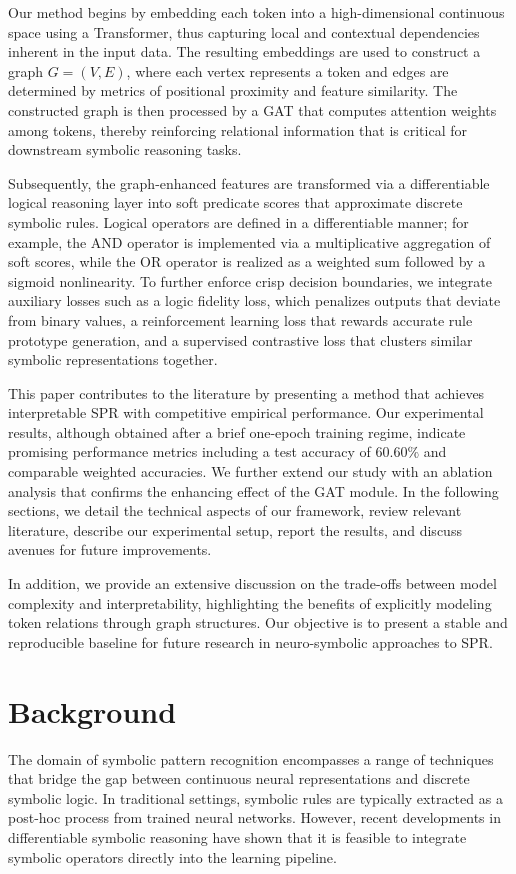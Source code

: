 \documentclass{article}
\begin{document}
Our method begins by embedding each token into a high-dimensional continuous space using a Transformer, thus capturing local and contextual dependencies inherent in the input data. The resulting embeddings are used to construct a graph \(G=(V,E)\), where each vertex represents a token and edges are determined by metrics of positional proximity and feature similarity. The constructed graph is then processed by a GAT that computes attention weights among tokens, thereby reinforcing relational information that is critical for downstream symbolic reasoning tasks.

Subsequently, the graph-enhanced features are transformed via a differentiable logical reasoning layer into soft predicate scores that approximate discrete symbolic rules. Logical operators are defined in a differentiable manner; for example, the \(\text{AND}\) operator is implemented via a multiplicative aggregation of soft scores, while the \(\text{OR}\) operator is realized as a weighted sum followed by a sigmoid nonlinearity. To further enforce crisp decision boundaries, we integrate auxiliary losses such as a logic fidelity loss, which penalizes outputs that deviate from binary values, a reinforcement learning loss that rewards accurate rule prototype generation, and a supervised contrastive loss that clusters similar symbolic representations together. 

This paper contributes to the literature by presenting a method that achieves interpretable SPR with competitive empirical performance. Our experimental results, although obtained after a brief one-epoch training regime, indicate promising performance metrics including a test accuracy of \(60.60\%\) and comparable weighted accuracies. We further extend our study with an ablation analysis that confirms the enhancing effect of the GAT module. In the following sections, we detail the technical aspects of our framework, review relevant literature, describe our experimental setup, report the results, and discuss avenues for future improvements.

In addition, we provide an extensive discussion on the trade-offs between model complexity and interpretability, highlighting the benefits of explicitly modeling token relations through graph structures. Our objective is to present a stable and reproducible baseline for future research in neuro-symbolic approaches to SPR.

\section{Background}
The domain of symbolic pattern recognition encompasses a range of techniques that bridge the gap between continuous neural representations and discrete symbolic logic. In traditional settings, symbolic rules are typically extracted as a post-hoc process from trained neural networks. However, recent developments in differentiable symbolic reasoning have shown that it is feasible to integrate symbolic operators directly into the learning pipeline. 
\end{document}
